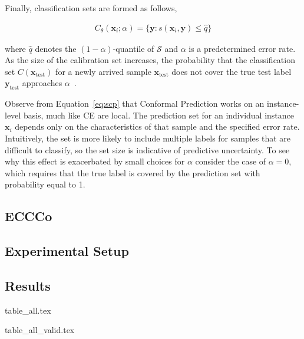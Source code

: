 \documentclass{article}
\begin{document}
Finally, classification sets are formed as follows,

\begin{equation}\label{eq:scp}
  \begin{aligned}
    C_{\theta}(\mathbf{x}_i;\alpha)=\{\mathbf{y}: s(\mathbf{x}_i,\mathbf{y}) \le \hat{q}\}
  \end{aligned}
\end{equation}

where $\hat{q}$ denotes the $(1-\alpha)$-quantile of $\mathcal{S}$ and $\alpha$ is a predetermined error rate. As the size of the calibration set increases, the probability that the classification set $C(\mathbf{x}_{\text{test}})$ for a newly arrived sample $\mathbf{x}_{\text{test}}$ does not cover the true test label $\mathbf{y}_{\text{test}}$ approaches $\alpha$~\citep{angelopoulos2021gentle}. 

Observe from Equation~\ref{eq:scp} that Conformal Prediction works on an instance-level basis, much like CE are local. The prediction set for an individual instance $\mathbf{x}_i$ depends only on the characteristics of that sample and the specified error rate. Intuitively, the set is more likely to include multiple labels for samples that are difficult to classify, so the set size is indicative of predictive uncertainty. To see why this effect is exacerbated by small choices for $\alpha$ consider the case of $\alpha=0$, which requires that the true label is covered by the prediction set with probability equal to 1.

\subsection{ECCCo}\label{app:eccco}

\subsection{Experimental Setup}\label{app:setup}
\subsection{Results}\label{app:results}

{table_all.tex}

{table_all_valid.tex}
\end{document}
